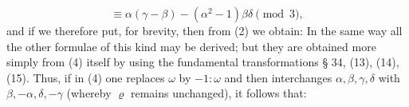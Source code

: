 \[
\equiv \alpha(\gamma-\beta) - (\alpha^2-1)\beta\delta \pmod{3},
\]
and if we therefore put, for brevity,
then from (2) we obtain:
In the same way all the other formulae of this kind may be derived; but they are obtained more simply from (4) itself by using the fundamental transformations § 34, (13), (14), (15). Thus, if in (4) one replaces $\omega$ by $-1:\omega$ and then interchanges $\alpha, \beta, \gamma, \delta$ with $\beta, -\alpha, \delta, -\gamma$ (whereby $\varrho$ remains unchanged), it follows that:

